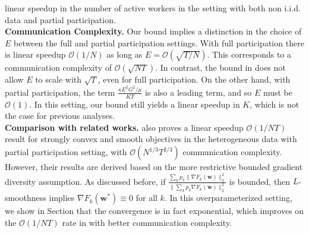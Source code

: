 linear speedup in the number of active workers in the setting with
both non i.i.d. data and partial participation. \\
\textbf{Communication Complexity.} Our bound implies a distinction
in the choice of $E$ between the full and partial participation settings.
With full participation there is linear speedup $\mathcal{O}(1/N)$
as long as $E=\mathcal{O}(\sqrt{T/N})$. This corresponds to a communication
complexity of $\mathcal{O}(\sqrt{NT})$. In contrast, the bound in
\cite{li2019convergence} does not allow $E$ to scale with $\sqrt{T}$,
even for full participation. On the other hand, with partial participation,
the term $\frac{\kappa E^{2}G^{2}/\mu}{KT}$ is also a leading term,
and so $E$ must be $\mathcal{O}(1)$. In this setting, our bound
still yields a linear speedup in $K$, which is not the case for previous
analyses. \\
\textbf{Comparison with related works.} \cite{haddadpour2019convergence}
also proves a linear speedup $\mathcal{O}(1/NT)$ result for strongly
convex and smooth objectives in the heterogeneous data with partial
participation setting, with $\mathcal{O}(N^{1/3}T^{2/3})$ communication
complexity. However, their results are derived based on the more restrictive
bounded gradient diversity assumption. As discussed before, if $\frac{\sum_{k}p_{k}\|\nabla F_{k}(\mathbf{w})\|_{2}^{2}}{\|\sum_{k}p_{k}\nabla F_{k}(\mathbf{w})\|_{2}^{2}}$
is bounded, then $L$-smoothness implies $\nabla F_{k}(\mathbf{w}^{\ast})\equiv0$
for all $k$. In this overparameterized setting, we show in Section
\label{sec:overparameterized} that the convergence is in fact exponential,
which improves on the $\mathcal{O}(1/NT)$ rate in \cite{haddadpour2019convergence}
with better communication complexity.

